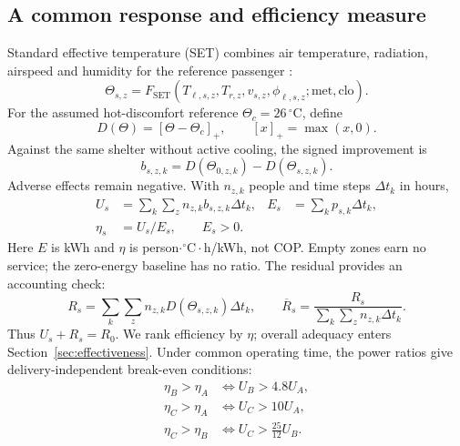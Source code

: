 \subsection{A common response and efficiency measure}
Standard effective temperature (SET) combines air temperature, radiation, airspeed and humidity for the reference passenger \cite{thermalcomfort,pythermal}:
\begin{equation}
 \Theta_{s,z}=F_{\mathrm{SET}}(T_{\ell,s,z},T_{r,z},v_{s,z},\phi_{\ell,s,z};\mathrm{met},\mathrm{clo}).
\label{eq:set}
\end{equation}
For the assumed hot-discomfort reference $\Theta_c=26\,^{\circ}\mathrm C$, define
\begin{equation}
 D(\Theta)=[\Theta-\Theta_c]_+,\qquad [x]_+=\max(x,0).
\end{equation}
Against the same shelter without active cooling, the signed improvement is
\begin{equation}
 b_{s,z,k}=D(\Theta_{0,z,k})-D(\Theta_{s,z,k}).
\end{equation}
Adverse effects remain negative. With $n_{z,k}$ people and time steps $\Delta t_k$ in hours,
\begin{align}
 U_s&=\sum_k\sum_z n_{z,k}b_{s,z,k}\Delta t_k, &
 E_s&=\sum_k p_{s,k}\Delta t_k,\\
 \eta_s&=U_s/E_s,\qquad E_s>0.
\label{eq:bus-efficiency}
\end{align}
Here $E$ is kWh and $\eta$ is person$\cdot{}^{\circ}\mathrm C\cdot$h/kWh, not COP. Empty zones earn no service; the zero-energy baseline has no ratio. The residual provides an accounting check:
\begin{equation}
 R_s=\sum_k\sum_z n_{z,k}D(\Theta_{s,z,k})\Delta t_k,
 \qquad \overline R_s=\frac{R_s}{\sum_k\sum_z n_{z,k}\Delta t_k}.
\label{eq:remaining}
\end{equation}
Thus $U_s+R_s=R_0$. We rank efficiency by $\eta$; overall adequacy enters Section~\ref{sec:effectiveness}. Under common operating time, the power ratios give delivery-independent break-even conditions:
\begin{equation}
\begin{aligned}
 \eta_B>\eta_A&\iff U_B>4.8U_A,\\
 \eta_C>\eta_A&\iff U_C>10U_A,\\
 \eta_C>\eta_B&\iff U_C>\frac{25}{12}U_B.
\end{aligned}
\label{eq:break-even}
\end{equation}

